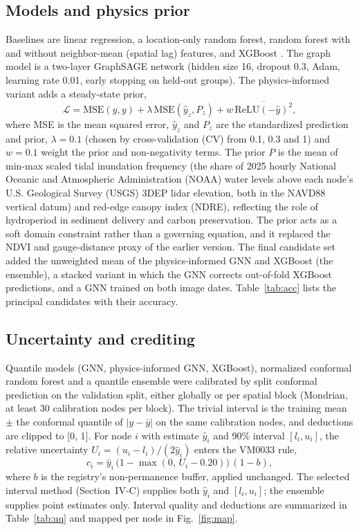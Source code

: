 \documentclass[conference]{IEEEtran}
\begin{document}
\subsection{Models and physics prior}
Baselines are linear regression, a location-only random forest, random forest with and without neighbor-mean (spatial lag) features, and XGBoost \cite{breiman2001rf,chen2016xgboost}.
The graph model is a two-layer GraphSAGE network (hidden size 16, dropout 0.3, Adam, learning rate 0.01, early stopping on held-out groups).
The physics-informed variant adds a steady-state prior,
\begin{equation}
\mathcal{L}=\mathrm{MSE}(\hat{y},y)+\lambda\,\mathrm{MSE}(\hat{y}_z,P_z)+w\,\overline{\mathrm{ReLU}(-\hat{y})^2},
\label{eq:loss}
\end{equation}
where MSE is the mean squared error, $\hat{y}_z$ and $P_z$ are the standardized prediction and prior, $\lambda=0.1$ (chosen by cross-validation (CV) from 0.1, 0.3 and 1) and $w=0.1$ weight the prior and non-negativity terms.
The prior $P$ is the mean of min-max scaled tidal inundation frequency (the share of 2025 hourly National Oceanic and Atmospheric Administration (NOAA) water levels above each node's U.S. Geological Survey (USGS) 3DEP lidar elevation, both in the NAVD88 vertical datum) and red-edge canopy index (NDRE), reflecting the role of hydroperiod in sediment delivery and carbon preservation.
The prior acts as a soft domain constraint rather than a governing equation, and it replaced the NDVI and gauge-distance proxy of the earlier version.
The final candidate set added the unweighted mean of the physics-informed GNN and XGBoost (the ensemble), a stacked variant in which the GNN corrects out-of-fold XGBoost predictions, and a GNN trained on both image dates.
Table~\ref{tab:acc} lists the principal candidates with their accuracy.

\subsection{Uncertainty and crediting}
Quantile models (GNN, physics-informed GNN, XGBoost), normalized conformal random forest and a quantile ensemble were calibrated by split conformal prediction on the validation split, either globally or per spatial block (Mondrian, at least 30 calibration nodes per block).
The trivial interval is the training mean $\pm$ the conformal quantile of $|y-\bar{y}|$ on the same calibration nodes, and deductions are clipped to [0, 1].
For node $i$ with estimate $\hat{y}_i$ and 90\% interval $[l_i,u_i]$, the relative uncertainty $U_i=(u_i-l_i)/(2\hat{y}_i)$ enters the VM0033 rule,
\begin{equation}
c_i=\hat{y}_i\,\bigl(1-\max(0,\,U_i-0.20)\bigr)\,(1-b),
\label{eq:credit}
\end{equation}
where $b$ is the registry's non-permanence buffer, applied unchanged. The selected interval method (Section~IV-C) supplies both $\hat{y}_i$ and $[l_i,u_i]$; the ensemble supplies point estimates only.
Interval quality and deductions are summarized in Table~\ref{tab:uq} and mapped per node in Fig.~\ref{fig:map}.
\end{document}
